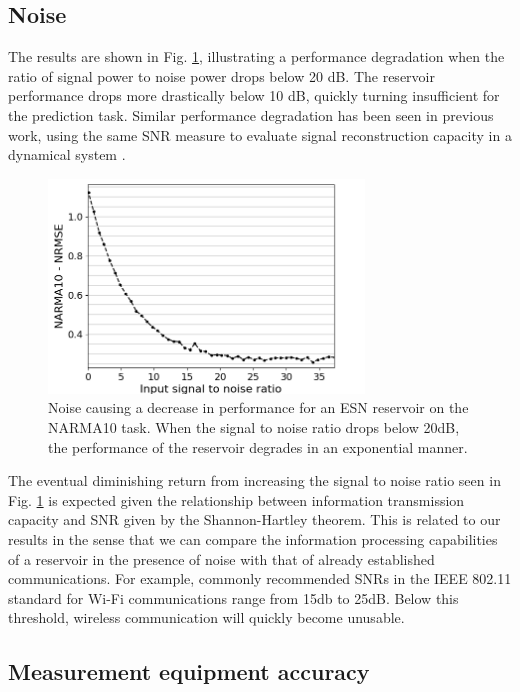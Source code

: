 \subsection{Noise}

The results are shown in Fig. \ref{input_noise_snr}, illustrating a performance
degradation when the ratio of signal power to noise power drops below 20 dB. The
reservoir performance drops more drastically below 10 dB, quickly turning
insufficient for the prediction task. Similar performance degradation has been
seen in previous work, using the same SNR measure to evaluate signal
reconstruction capacity in a dynamical system \cite{dambre_information_2012}.

\begin{figure}
  \centering
  \includegraphics[width=3.3in]{img/input_noise_snr.png}
  \caption{
    Noise causing a decrease in performance for an ESN reservoir on the NARMA10
task. When the signal to noise ratio drops below 20dB, the performance of the
reservoir degrades in an exponential manner.
  }
  \label{input_noise_snr}
\end{figure}

The eventual diminishing return from increasing the signal to noise ratio seen
in Fig. \ref{input_noise_snr} is expected given the relationship between
information transmission capacity and SNR given by the Shannon-Hartley
theorem. This is related to our results in the sense that we can compare the
information processing capabilities of a reservoir in the presence of noise with
that of already established communications. For example, commonly recommended
SNRs in the IEEE 802.11 standard for Wi-Fi communications range from 15db to
25dB. Below this threshold, wireless communication will quickly become unusable.

\subsection{Measurement equipment accuracy}


